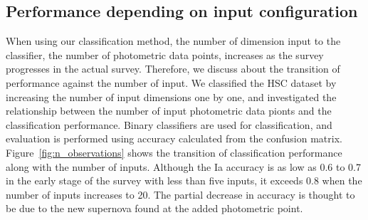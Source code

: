 \documentclass[useamsfonts]{pasj01}
\begin{document}
\subsection{Performance depending on input configuration}
%
When using our classification method, the number of dimension input to the classifier, the number of photometric data points, increases as the survey progresses in the actual survey.
Therefore, we discuss about the transition of performance against the number of input.
We classified the HSC dataset by increasing the number of input dimensions one by one, and investigated the relationship between the number of input photometric data pionts and the classification performance.
Binary classifiers are used for classification, and evaluation is performed using accuracy calculated from the confusion matrix.
Figure\ \ref{fig:n_observations} shows the transition of classification performance along with the number of inputs.
Although the Ia accuracy is as low as 0.6 to 0.7 in the early stage of the survey with less than five inputs, it exceeds 0.8 when the number of inputs increases to 20.
The partial decrease in accuracy is thought to be due to the new supernova found at the added photometric point.
\end{document}
